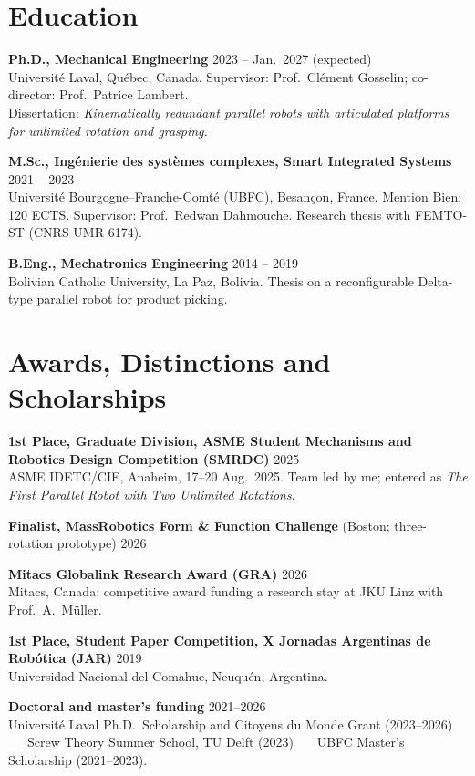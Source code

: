 \documentclass[11pt,letterpaper]{article}
\newenvironment{items}{\begin{list}{}{%
  \setlength{\leftmargin}{1.4em}\setlength{\itemindent}{-0.4em}
  \setlength{\itemsep}{0.5pt}\setlength{\parsep}{0pt}\setlength{\topsep}{1pt}}}%
  {\end{list}}
\newcommand{\dateline}[1]{\hfill{\footnotesize\color{cap} #1}}
\begin{document}
\section{Education}
\begin{items}
\item[] \textbf{Ph.D., Mechanical Engineering} \dateline{2023 -- Jan.~2027 (expected)}\\
{\footnotesize Universit\'e Laval, Qu\'ebec, Canada. Supervisor: Prof.~Cl\'ement Gosselin; co-director: Prof.~Patrice Lambert.\\
Dissertation: \emph{Kinematically redundant parallel robots with articulated platforms for unlimited rotation and grasping.}}
\item[] \textbf{M.Sc., Ing\'enierie des syst\`emes complexes, Smart Integrated Systems} \dateline{2021 -- 2023}\\
{\footnotesize Universit\'e Bourgogne--Franche-Comt\'e (UBFC), Besan\c{c}on, France. Mention Bien; 120 ECTS.
Supervisor: Prof.~Redwan Dahmouche. Research thesis with FEMTO-ST (CNRS UMR 6174).}

\item[] \textbf{B.Eng., Mechatronics Engineering} \dateline{2014 -- 2019}\\
{\footnotesize Bolivian Catholic University, La Paz, Bolivia. Thesis on a reconfigurable Delta-type parallel robot for product picking.}
\end{items}

\section{Awards, Distinctions and Scholarships}
\begin{items}
\item[] \textbf{1st Place, Graduate Division, ASME Student Mechanisms and Robotics Design Competition (SMRDC)} \dateline{2025}\\
{\footnotesize ASME IDETC/CIE, Anaheim, 17--20 Aug.~2025. Team led by me; entered as \emph{The First Parallel Robot with Two Unlimited Rotations}.}
\item[] \textbf{Finalist, MassRobotics Form \& Function Challenge} {\footnotesize (Boston; three-rotation prototype)} \dateline{2026}
\item[] \textbf{Mitacs Globalink Research Award (GRA)} \dateline{2026}\\
{\footnotesize Mitacs, Canada; competitive award funding a research stay at JKU Linz with Prof.~A.~M\"uller.}
\item[] \textbf{1st Place, Student Paper Competition, X Jornadas Argentinas de Rob\'otica (JAR)} \dateline{2019}\\
{\footnotesize Universidad Nacional del Comahue, Neuqu\'en, Argentina.}
\item[] \textbf{Doctoral and master's funding} \dateline{2021--2026}\\
{\footnotesize Universit\'e Laval Ph.D.\ Scholarship and Citoyens du Monde Grant (2023--2026) \ \textbullet\ \ Screw Theory Summer School, TU Delft (2023) \ \textbullet\ \ UBFC Master's Scholarship (2021--2023).}
\end{items}
\end{document}
